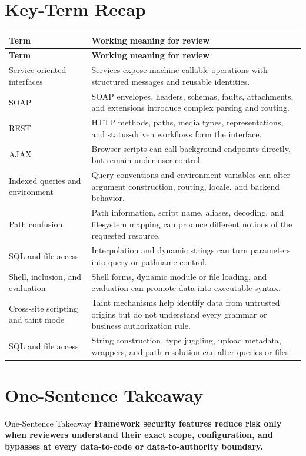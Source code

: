 \documentclass[11pt,letterpaper]{article}
\begin{document}
\section{Key-Term Recap}
\begin{longtable}{>{\raggedright\arraybackslash}p{}p{}}
\toprule
\textbf{Term} & \textbf{Working meaning for review} \\
\midrule
\endfirsthead
\toprule
\textbf{Term} & \textbf{Working meaning for review} \\
\midrule
\endhead
Service-oriented interfaces & Services expose machine-callable operations with structured messages and reusable identities. \\
SOAP & SOAP envelopes, headers, schemas, faults, attachments, and extensions introduce complex parsing and routing. \\
REST & HTTP methods, paths, media types, representations, and status-driven workflows form the interface. \\
AJAX & Browser scripts can call background endpoints directly, but remain under user control. \\
Indexed queries and environment & Query conventions and environment variables can alter argument construction, routing, locale, and backend behavior. \\
Path confusion & Path information, script name, aliases, decoding, and filesystem mapping can produce different notions of the requested resource. \\
SQL and file access & Interpolation and dynamic strings can turn parameters into query or pathname control. \\
Shell, inclusion, and evaluation & Shell forms, dynamic module or file loading, and evaluation can promote data into executable syntax. \\
Cross-site scripting and taint mode & Taint mechanisms help identify data from untrusted origins but do not understand every grammar or business authorization rule. \\
SQL and file access & String construction, type juggling, upload metadata, wrappers, and path resolution can alter queries or files. \\
\bottomrule
\end{longtable}
\section{One-Sentence Takeaway}
\begin{CornellExamBox}{One-Sentence Takeaway}
\textbf{Framework security features reduce risk only when reviewers understand their exact scope, configuration, and bypasses at every data-to-code or data-to-authority boundary.}
\end{CornellExamBox}
\end{document}
